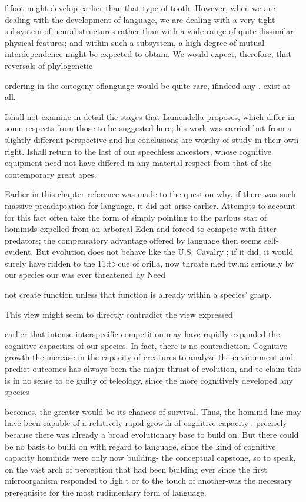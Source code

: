 f foot might develop earlier than that type of tooth. However, when we are dealing with the development of language, we are dealing with a very tight subsystem of neural structures rather than with a wide range of quite dissimilar physical features; and within such a sub\-system, a high degree of mutual interdependence might be expected to obtain. We would expect, therefore, that reversals of phylogenetic

ordering in the ontogeny oflanguage would be quite rare, ifindeed any . exist at all.

Ishall not examine in detail the stages that Lamendella proposes, which differ in some respects from those to be suggested here; his work was carried but from a slightly different perspective and his conclusions are worthy of study in their own right. Ishall return to the last of our speechless ancestors, whose cognitive equipment need not have differed in any material respect from that of the contemporary great apes.

Earlier in this chapter reference was made to the question why, if there was such massive preadaptation for language, it did not arise earlier. Attempts to account for this fact often take the form of simply pointing to the parlous stat of hominids expelled from an arboreal Eden and forced to compete with fitter predators; the compensatory advantage offered by language then seems self-evident. But evolution does not behave like the U.S. Cavalry ; if it did, it would surely have ridden to the 11:t{\textgreater}cue of orilla, now thrcate.n.ed tw.m: seriously by our species our was ever threatened hy Need

not create function unless that function is already within a species' grasp.

This view might seem to directly contradict the view expressed

earlier that intense interspecific competition may have rapidly ex\-panded the cognitive capacities of our species. In fact, there is no contradiction. Cognitive growth-the increase in the capacity of crea\-tures to analyze the environment and predict outcomes-has always been the major thrust of evolution, and to claim this is in no sense to be guilty of teleology, since the more cognitively developed any species


becomes, the greater would be its chances of survival. Thus, the homi\-nid line may have been capable of a relatively rapid growth of cognitive capacity . precisely because there was already a broad evolutionary base to build on. But there could be no basis to build on with regard to language, since the kind of cognitive capacity hominids were only now building- the conceptual capstone, so to speak, on the vast arch of perception that had been building ever since the first microorganism responded to ligh t or to the touch of another-was the necessary prerequisite for the most rudimentary form of language.

